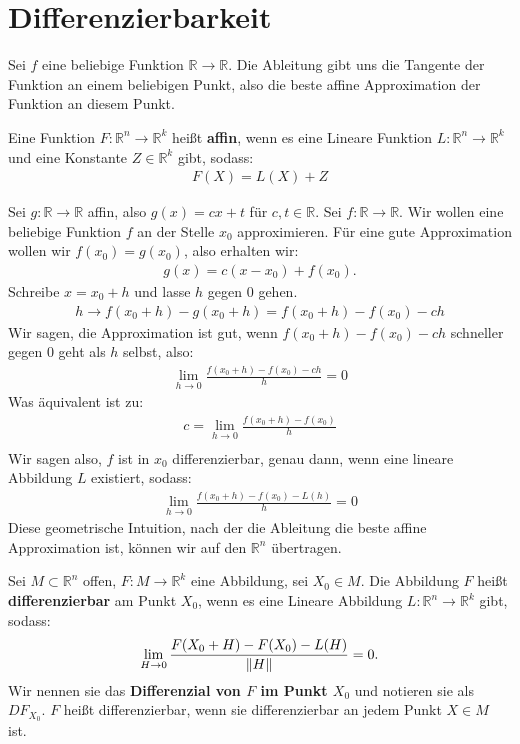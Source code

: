 \documentclass{report}
\newcommand*{\newpar}{\par\vspace{\baselineskip}\noindent}
\newcommand{\tbf}[1]{\textbf{#1}}
\newcommand{\bR}{\mathbb{R}}
\begin{document}
\section{Differenzierbarkeit}
Sei $f$ eine beliebige Funktion $\bR \to \bR$. Die Ableitung gibt uns die Tangente der Funktion an einem beliebigen Punkt, also die beste affine Approximation der Funktion an diesem Punkt.
\begin{definition}
 Eine Funktion $F : \bR^n \to \bR^k$ heißt \tbf{affin}, wenn es eine Lineare Funktion $L : \bR^n \to \bR^k$ und eine Konstante $Z \in \bR^k$ gibt, sodass:
 \begin{align*}
  F(X) = L(X) + Z
 \end{align*}
\end{definition}
\newpar
Sei $g : \bR \to \bR$ affin, also $g(x) = cx + t$ für $c,t \in \bR$. Sei $f : \bR \to \bR$. Wir wollen eine beliebige Funktion $f$ an der Stelle $x_0$ approximieren. Für eine gute Approximation wollen wir $f(x_0) = g(x_0)$, also erhalten wir:
\begin{align*}
 g(x) = c(x - x_0) + f(x_0).
\end{align*}
Schreibe $x = x_0 + h$ und lasse $h$ gegen $0$ gehen.
\begin{align*}
 h \to f(x_0 + h) - g(x_0 + h) = f(x_0 + h) - f(x_0) - ch
\end{align*}
Wir sagen, die Approximation ist gut, wenn $f(x_0 + h) - f(x_0) - ch$ schneller gegen $0$ geht als $h$ selbst, also:
\begin{align}
\label{eq:goodapprox}
 \lim_{h \to 0} \frac{f(x_0 + h) - f(x_0) - ch}{h} = 0
\end{align}
Was äquivalent ist zu:
\begin{align*}
 c = \lim_{h \to 0} \frac{f(x_0 + h) - f(x_0)}{h}\\
\end{align*}
Wir sagen also, $f$ ist in $x_0$ differenzierbar, genau dann, wenn eine lineare Abbildung $L$ existiert, sodass:
\begin{align*}
 \lim_{h \to 0} \frac{f(x_0 + h) - f(x_0) - L(h)}{h} = 0
\end{align*}
Diese geometrische Intuition, nach der die Ableitung die beste affine Approximation ist, können wir auf den $\bR^n$ übertragen. 
\begin{definition}
 Sei $M \subset \bR^n$ offen, $F : M \to \bR^k$ eine Abbildung, sei $X_0 \in M$. Die Abbildung $F$ heißt \tbf{differenzierbar} am Punkt $X_0$, wenn es eine Lineare Abbildung $L : \bR^n \to \bR^k$ gibt, sodass:
 \begin{align*}
  \lim_{H \to 0} \frac{F(X_0 + H) - F(X_0) - L(H)}{\norm{H}} = 0.
 \end{align*}
 Wir nennen sie das \tbf{Differenzial von $F$ im Punkt $X_0$} und notieren sie als $DF_{X_0}$. $F$ heißt differenzierbar, wenn sie differenzierbar an jedem Punkt $X \in M$ ist.
\end{definition}
\end{document}
